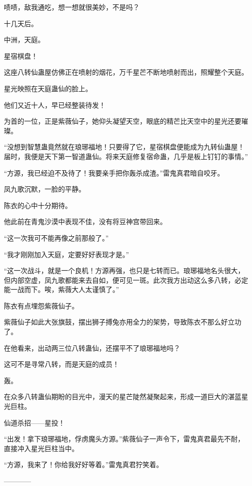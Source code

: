\begin{this_body}
啧啧，敌我通吃，想一想就很美妙，不是吗？

十几天后。

中洲，天庭。

星宿棋盘！

这座八转仙蛊屋仿佛正在喷射的烟花，万千星芒不断地喷射而出，照耀整个天庭。

星光映照在天庭蛊仙的脸上。

他们又近十人，早已经整装待发！

为首的一位，正是紫薇仙子，她仰头凝望天空，眼底的精芒比天空中的星光还要璀璨。

“没想到智慧蛊竟然就在琅琊福地！只要得了它，星宿棋盘便能成为九转仙蛊屋！届时，我便是天下第一智道蛊仙。将来天庭修复宿命蛊，几乎是板上钉钉的事情。”

“方源，我已经迫不及待了！我要亲手把你轰杀成渣。”雷鬼真君暗自咬牙。

凤九歌沉默，一脸的平静。

陈衣的心中十分期待。

他此前在青鬼沙漠中表现不佳，没有将豆神宫带回来。

“这一次我可不能再像之前那般了。”

“我才刚刚加入天庭，定要好好表现才是。”

“这一次战斗，就是一个良机！方源再强，也只是七转而已。琅琊福地名头很大，但内部空虚，凤九歌都能来去自如，便可见一斑。此次我方出动这么多八转，必定能一战而下。唉，紫薇大人太谨慎了。”

陈衣有点埋怨紫薇仙子。

紫薇仙子如此大张旗鼓，摆出狮子搏兔亦用全力的架势，导致陈衣不那么好立功了。

在他看来，出动两三位八转蛊仙，还摆平不了琅琊福地吗？

这可不是寻常八转，而是天庭的成员！

轰。

在众多八转蛊仙期盼的目光中，漫天的星芒陡然凝聚起来，形成一道巨大的湛蓝星光巨柱。

仙道杀招——星投！

“出发！拿下琅琊福地，俘虏魔头方源。”紫薇仙子一声令下，雷鬼真君最先不耐，直接冲入星光巨柱当中。

“方源，我来了！你给我好好等着。”雷鬼真君狞笑着。

------------

\end{this_body}

